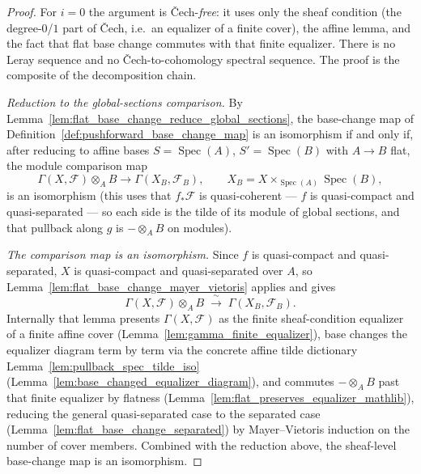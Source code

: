 \begin{proof}
  For \(i = 0\) the argument is {\v C}ech-\emph{free}: it uses only the sheaf
  condition (the degree-\(0\)/\(1\) part of {\v C}ech, i.e.\ an equalizer of a finite
  cover), the affine lemma, and the fact that flat base change commutes with that
  finite equalizer. There is no Leray sequence and no {\v C}ech-to-cohomology spectral
  sequence. The proof is the composite of the decomposition chain.

  \medskip
  \emph{Reduction to the global-sections comparison.} By
  Lemma~\ref{lem:flat_base_change_reduce_global_sections}, the base-change map of
  Definition~\ref{def:pushforward_base_change_map} is an isomorphism if and only if,
  after reducing to affine bases \(S = \operatorname{Spec}(A)\),
  \(S' = \operatorname{Spec}(B)\) with \(A \to B\) flat, the module comparison map
  \[
    \Gamma(X, \mathcal{F}) \otimes_A B \longrightarrow \Gamma(X_B, \mathcal{F}_B),
    \qquad X_B = X \times_{\operatorname{Spec}(A)} \operatorname{Spec}(B),
  \]
  is an isomorphism (this uses that \(f_*\mathcal{F}\) is quasi-coherent — \(f\) is
  quasi-compact and quasi-separated — so each side is the tilde of its module of
  global sections, and that pullback along \(g\) is \(- \otimes_A B\) on modules).

  \medskip
  \emph{The comparison map is an isomorphism.} Since \(f\) is quasi-compact and
  quasi-separated, \(X\) is quasi-compact and quasi-separated over \(A\), so
  Lemma~\ref{lem:flat_base_change_mayer_vietoris} applies and gives
  \[
    \Gamma(X, \mathcal{F}) \otimes_A B \;\xrightarrow{\ \sim\ }\; \Gamma(X_B, \mathcal{F}_B).
  \]
  Internally that lemma presents \(\Gamma(X,\mathcal{F})\) as the finite
  sheaf-condition equalizer of a finite affine cover
  (Lemma~\ref{lem:gamma_finite_equalizer}), base changes the equalizer diagram term by
  term via the concrete affine tilde dictionary Lemma~\ref{lem:pullback_spec_tilde_iso}
  (Lemma~\ref{lem:base_changed_equalizer_diagram}), and commutes \(- \otimes_A B\)
  past that finite equalizer by flatness
  (Lemma~\ref{lem:flat_preserves_equalizer_mathlib}), reducing the general
  quasi-separated case to the separated case
  (Lemma~\ref{lem:flat_base_change_separated}) by Mayer--Vietoris induction on the
  number of cover members. Combined with the reduction above, the sheaf-level
  base-change map is an isomorphism.
\end{proof}

